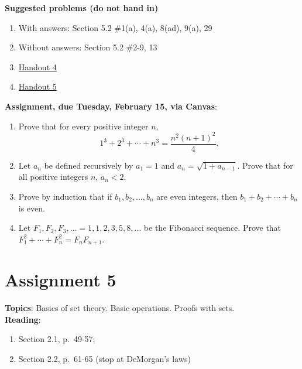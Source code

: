 \documentclass[12pt]{article}
\begin{document}
\noindent \textbf{Suggested problems (do not hand in)}

\begin{enumerate}
\item With answers: Section 5.2 \#1(a), 4(a), 8(ad), 9(a), 29
\item Without answers: Section 5.2 \#2-9, 13
\item \href{https://www.math.emory.edu/~dzb/teaching/250Fall2021/handouts/250-H04-induction-warmup.pdf}{Handout 4}
\item \href{https://www.math.emory.edu/~dzb/teaching/250Fall2021/handouts/250-H05-induction-problems.pdf}{Handout 5}
\end{enumerate}

\noindent \textbf{Assignment, due Tuesday, February 15, via Canvas}:
\begin{enumerate}
\item Prove that for every positive integer $n$,
 $$1^3 + 2^3 + \cdots +n^3 = \frac{n^2(n+1)^2}{4}.$$ 
\item Let $a_n$ be defined recursively by $a_1 = 1$ and $a_n = \sqrt{1 + a_{n-1}}$. Prove that for all positive integers $n$, $a_n < 2$.
\item Prove by induction that if $b_1, b_2, \ldots , b_n$ are even integers, then $b_1 + b_2 + \cdots + b_n$ is even.
 \item Let $F_1, F_2, F_3, \ldots = 1,1,2,3,5,8,\ldots$ be the Fibonacci sequence. Prove that $F_1^2 + \cdots + F_n^2 = F_nF_{n+1}$.
 \end{enumerate}
 

\newpage
\section[5 (due February 22): Basics of set theory. Basic operations. Proofs with sets.]{Assignment 5}

\textbf{Topics}: Basics of set theory. Basic operations. Proofs with sets.
\\

\noindent \textbf{Reading}:
\begin{enumerate}
\item Section 2.1, p.~49-57; 
\item Section 2.2, p.~61-65 (stop at DeMorgan's laws)
\end{enumerate}
\end{document}
